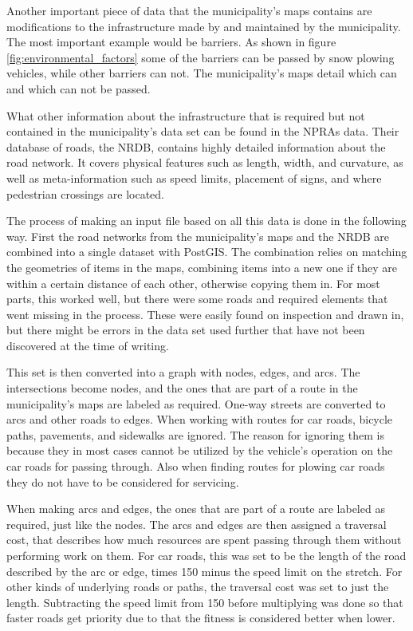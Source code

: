 Another important piece of data that the municipality's maps contains are modifications to the infrastructure made by and maintained by the municipality. The most important example would be barriers. As shown in figure \ref{fig:environmental_factors} some of the barriers can be passed by snow plowing vehicles, while other barriers can not. The municipality's maps detail which can and which can not be passed.

What other information about the infrastructure that is required but not contained in the municipality's data set can be found in the NPRAs data. Their database of roads, the NRDB, contains highly detailed information about the road network. It covers physical features such as length, width, and curvature, as well as meta-information such as speed limits, placement of signs, and where pedestrian crossings are located.

The process of making an input file based on all this data is done in the following way. First the road networks from the municipality's maps and the NRDB are combined into a single dataset with PostGIS. The combination relies on matching the geometries of items in the maps, combining items into a new one if they are within a certain distance of each other, otherwise copying them in. For most parts, this worked well, but there were some roads and required elements that went missing in the process. These were easily found on inspection and drawn in, but there might be errors in the data set used further that have not been discovered at the time of writing.

This set is then converted into a graph with nodes, edges, and arcs. The intersections become nodes, and the ones that are part of a route in the municipality's maps are labeled as required. One-way streets are converted to arcs and other roads to edges. When working with routes for car roads, bicycle paths, pavements, and sidewalks are ignored. The reason for ignoring them is because they in most cases cannot be utilized by the vehicle's operation on the car roads for passing through. Also when finding routes for plowing car roads they do not have to be considered for servicing.

When making arcs and edges, the ones that are part of a route are labeled as required, just like the nodes. The arcs and edges are then assigned a traversal cost, that describes how much resources are spent passing through them without performing work on them. For car roads, this was set to be the length of the road described by the arc or edge, times 150 minus the speed limit on the stretch. For other kinds of underlying roads or paths, the traversal cost was set to just the length. Subtracting the speed limit from 150 before multiplying was done so that faster roads get priority due to that the fitness is considered better when lower.

